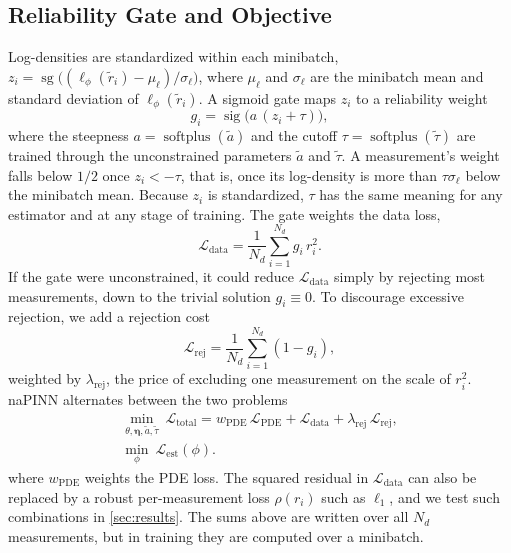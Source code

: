 \documentclass[twoside]{article}
\newcommand{\rej}{\lambda_{\mathrm{rej}}}
\newcommand{\wpde}{w_{\mathrm{PDE}}}
\newcommand{\sg}{\operatorname{sg}}
\DeclareMathOperator{\sig}{sig}
\DeclareMathOperator{\softplus}{softplus}
\begin{document}
\subsection{Reliability Gate and Objective}
Log-densities are standardized within each minibatch,
$z_i = \sg\big((\ell_\phi(\tilde r_i) - \mu_\ell)/\sigma_\ell\big)$, where
$\mu_\ell$ and $\sigma_\ell$ are the minibatch mean and standard deviation of
$\ell_\phi(\tilde r_i)$. A sigmoid gate maps $z_i$ to a reliability weight
\begin{equation}
g_i = \sig\!\big(a\,(z_i + \tau)\big),
\label{eq:gate}
\end{equation}
where the steepness $a = \softplus(\tilde a)$ and the cutoff
$\tau = \softplus(\tilde\tau)$ are trained through the unconstrained parameters
$\tilde a$ and $\tilde\tau$. A measurement's weight falls below $1/2$ once
$z_i < -\tau$, that is, once its log-density is more than $\tau\sigma_\ell$
below the minibatch mean. Because $z_i$ is standardized, $\tau$ has the same
meaning for any estimator and at any stage of training. The gate weights the
data loss,
\begin{equation}
\mathcal{L}_{\mathrm{data}} = \frac{1}{N_d}\sum_{i=1}^{N_d} g_i\, r_i^2 .
\label{eq:data}
\end{equation}
If the gate were unconstrained, it could reduce $\mathcal{L}_{\mathrm{data}}$
simply by rejecting most measurements, down to the trivial solution
$g_i \equiv 0$. To discourage excessive rejection, we add a rejection cost
\begin{equation}
\mathcal{L}_{\mathrm{rej}} = \frac{1}{N_d}\sum_{i=1}^{N_d} (1 - g_i),
\label{eq:rej}
\end{equation}
weighted by $\rej$, the price of excluding one measurement on the scale of
$r_i^2$. naPINN alternates between the two problems
\begin{gather}
\min_{\theta,\boldsymbol{\eta},\tilde a,\tilde\tau}\
\mathcal{L}_{\mathrm{total}} = \wpde\,\mathcal{L}_{\mathrm{PDE}}
 + \mathcal{L}_{\mathrm{data}} + \rej\,\mathcal{L}_{\mathrm{rej}},
\label{eq:total}\\
\min_{\phi}\ \mathcal{L}_{\mathrm{est}}(\phi).
\label{eq:estmin}
\end{gather}
where $\wpde$ weights the PDE loss. The squared residual in
$\mathcal{L}_{\mathrm{data}}$ can also be replaced by a robust per-measurement
loss $\rho(r_i)$ such as $\ell_1$, and we test such combinations in
\cref{sec:results}. The sums above are written over all $N_d$ measurements, but
in training they are computed over a minibatch.
\end{document}
